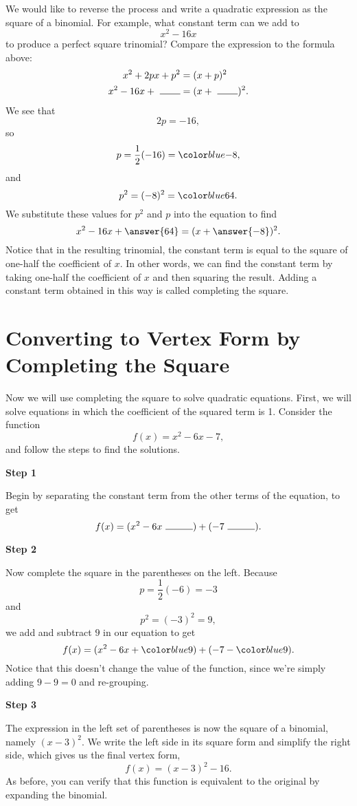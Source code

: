 \documentclass{ximera}
\begin{document}
   
   

We would like to reverse the process and write a quadratic expression as the square of a binomial. For example, what constant term can we add to
$$
    x^2 - 16x
$$
to produce a perfect square trinomial? Compare the expression to the formula above:
\begin{align*}
    x^2 + 2px + p^2 &= (x+p)^2 \\
    x^2 - 16x + \ \rule{0.75cm}{0.15mm} &= (x + \ \rule{0.75cm}{0.15mm})^2.
\end{align*}   
We see that   
$$
    2p = -16,
$$
so
$$
    p = \frac{1}{2}(-16) = \substitute{-8},
$$
and 
$$
    p^2 = (-8)^2 = \substitute{64}.
$$   
We substitute these values for $p^2$ and $p$ into the equation to find
$$
    x^2 - 16 x + \answer{64} = (x + \answer{- 8})^2.
$$
Notice that in the resulting trinomial, the constant term is equal to the square of one-half the coefficient of $x$. In other words, we can find the constant term by taking one-half the coefficient of $x$ and then squaring the result. Adding a constant term obtained in this way is called completing the square.   


\section{Converting to Vertex Form by Completing the Square}

Now we will use completing the square to solve quadratic equations. First, we will solve equations in which the coefficient of the squared term is 1. Consider the function
$$
    f(x) = x^2 - 6x - 7,
$$
and follow the steps to find the solutions.

\textbf{Step 1}

Begin by separating the constant term from the other terms of the equation, to get
$$
    f(x) = (x^2 - 6x\ \rule{1cm}{0.15mm}) + (-7\ \rule{1cm}{0.15mm}).
$$

\textbf{Step 2}

Now complete the square in the parentheses on the left. Because
$$
    p = \frac{1}{2}(-6) = -3
$$
and
$$
    p^2 = (-3)^2 = 9,
$$
we add and subtract $9$ in our equation to get
$$
    f(x) = (x^2-6x+\substitute{9}) + (-7 - \substitute{9}).
$$
Notice that this doesn't change the value of the function, since we're simply adding $9 - 9 = 0$ and re-grouping.

\textbf{Step 3}

The expression in the left set of parentheses is now the square of a binomial, namely $(x-3)^2$. We write the left side in its square form and simplify the right side, which gives us the final vertex form,
$$
    f(x) = (x-3)^2 - 16.
$$
As before, you can verify that this function is equivalent to the original by expanding the binomial.
\end{document}
